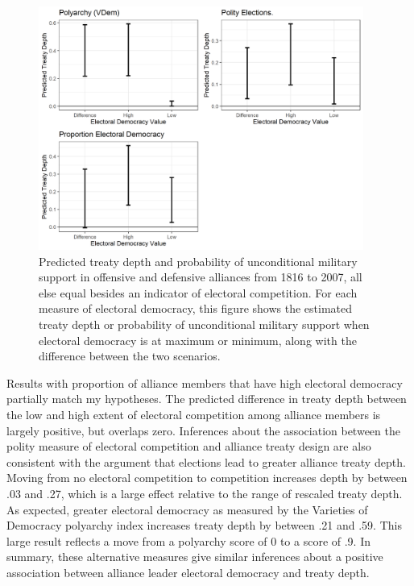 \documentclass[12pt]{article}
\begin{document}
\begin{figure}[hbtp]
\centering
\includegraphics[width=0.95\textwidth]{results-other-democ.png}
\caption{Predicted treaty depth and probability of unconditional military support in offensive and defensive alliances from 1816 to 2007, all else equal besides an indicator of electoral competition. For each measure of electoral democracy, this figure shows the estimated treaty depth or probability of unconditional military support when electoral democracy is at maximum or minimum, along with the difference between the two scenarios.}
\label{fig:results-other-democ}
\end{figure}


Results with proportion of alliance members that have high electoral democracy partially match my hypotheses.  
The predicted difference in treaty depth between the low and high extent of electoral competition among alliance members is largely positive, but overlaps zero. 
Inferences about the association between the polity measure of electoral competition and alliance treaty design are also consistent with the argument that elections lead to greater alliance treaty depth.
Moving from no electoral competition to competition increases depth by between .03 and .27, which is a large effect relative to the range of rescaled treaty depth. 
As expected, greater electoral democracy as measured by the Varieties of Democracy polyarchy index increases treaty depth by between .21 and .59.
This large result reflects a move from a polyarchy score of 0 to a score of .9. 
In summary, these alternative measures give similar inferences about a positive association between alliance leader electoral democracy and treaty depth. 
\end{document}
